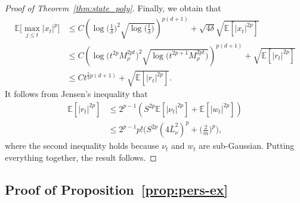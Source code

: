 \documentclass[11pt]{article}
\theoremstyle{plain}
\theoremstyle{definition}
\theoremstyle{remark}
\begin{document}
\begin{proof}[Proof of Theorem~\ref{thm:state_poly}]
Finally, we obtain that
\begin{align*}
    \mathbb{E}\Big [\max_{j\leq t}|x_t|^{p}\Big ]
    &\leq C\left(\log\bigg(\frac{1}{\delta}\bigg)^2\sqrt{\log\bigg(\frac{t}{\delta}\bigg)}\right)^{p(d+1)}+\sqrt{4\delta}\sqrt{\mathbb{E}[|x_t|^{2p}]}\\
    &\leq C\left (\log\big(t^{2p}M_{\rho}^{2pt}\big)^2\sqrt{\log\bigg(t^{2p+1}M_{\rho}^{2pt}\bigg)}\right)^{p(d+1)} +\sqrt{\mathbb{E}[|r_t|^{2p}]}\\
    & \leq C t^{\frac{5}{2}p(d+1)} + \sqrt{\mathbb{E}[|r_t|^{2p}]}.
\end{align*}
It follows from Jensen's inequality that 
\begin{equation}\nonumber
\begin{split}
\mathbb{E}[|r_t|^{2p}] &\leq  2^{p-1}(S^{2p}\mathbb{E}[|\nu_t|^{2p}] + \mathbb{E}[|w_t|^{2p}])\\
&\leq 2^{p-1}p!\bigg (S^{2p}(4\bar L_{\nu}^2)^p+\Big(\frac{2}{m}\Big )^p\bigg ),
\end{split}    
\end{equation}
where the second inequality holds because $\nu_t$ and $w_t$ are sub-Gaussian. 
Putting everything together, the result follows. 
\end{proof}



\subsection{Proof of Proposition~\ref{prop:pers-ex}}\label{app:prop:pers-ex}
\end{document}
